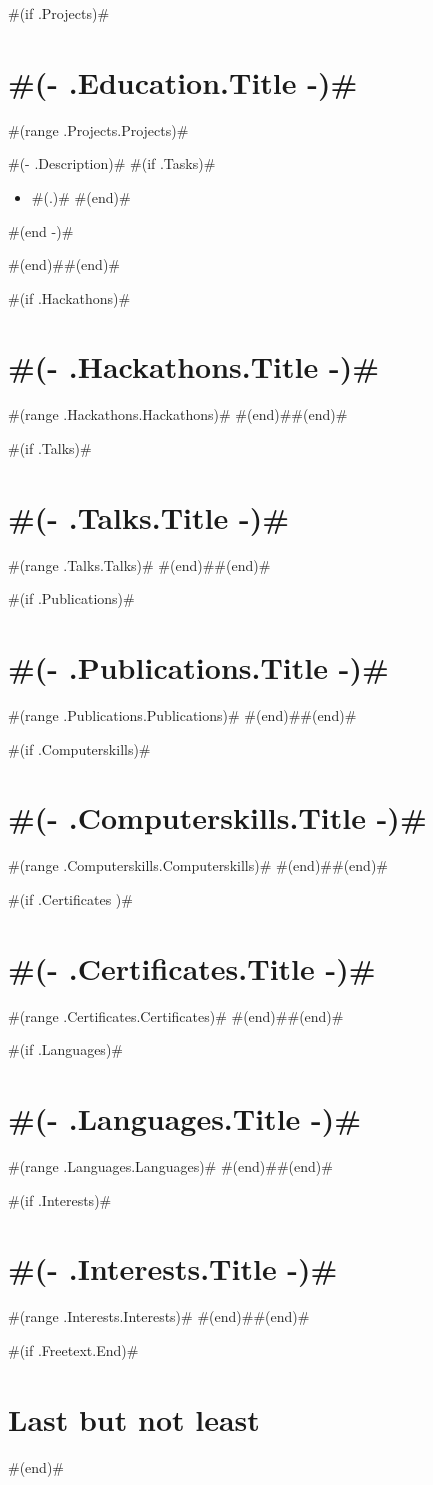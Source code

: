 \documentclass[10pt,a4paper,sans]{moderncv}
\begin{document}
#(if .Projects)#\section{ #(- .Education.Title -)# }
#(range .Projects.Projects)#
{ #(- .Description)# 
  #(if .Tasks)#\begin{itemize}
    #(range .Tasks)# \item #(.)#
    #(end)#\end{itemize}
  #(end -)# }
#(end)##(end)#

#(if .Hackathons)#\section{ #(- .Hackathons.Title -)# }
#(range .Hackathons.Hackathons)#
#(end)##(end)#

#(if .Talks)#\section{ #(- .Talks.Title -)#  }
#(range .Talks.Talks)#
#(end)##(end)#

#(if .Publications)#\section{ #(- .Publications.Title -)#  }
#(range .Publications.Publications)#
#(end)##(end)#

#(if .Computerskills)#\section{ #(- .Computerskills.Title -)#  }
#(range .Computerskills.Computerskills)#
#(end)##(end)#

#(if .Certificates )#\section{ #(- .Certificates.Title -)# }
#(range .Certificates.Certificates)#
#(end)##(end)#

#(if .Languages)#\section{ #(- .Languages.Title -)#  }
#(range .Languages.Languages)#
#(end)##(end)#

#(if .Interests)#\section{ #(- .Interests.Title -)#  }
#(range .Interests.Interests)#
#(end)##(end)#

#(if .Freetext.End)#\section{Last but not least}
#(end)#
\end{document}
